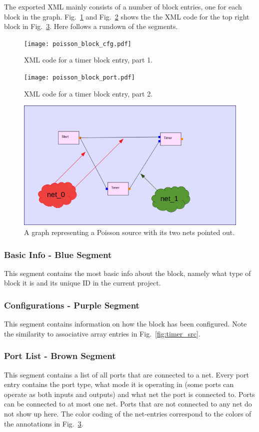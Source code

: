 \documentclass[journal,comsoc]{IEEEtran}
\begin{document}
The exported XML mainly consists of a number of block entries, one for each block in the graph.
Fig.~\ref{fig:xml1} and Fig.~\ref{fig:xml2} shows the the XML code for the top right block in
Fig.~\ref{fig:net}. Here follows a rundown of the segments.
\begin{figure}[!t]
    \centering
    \texttt{[image: poisson\_block\_cfg.pdf]}
    \caption{XML code for a timer block entry, part 1.}
    \label{fig:xml1}
\end{figure}
\begin{figure}[!t]
    \centering
    \texttt{[image: poisson\_block\_port.pdf]}
    \caption{XML code for a timer block entry, part 2.}
    \label{fig:xml2}
\end{figure}
\begin{figure}[!t]
    \centering
    \includegraphics[width=\columnwidth]{poisson_nets.png}
    \caption{A graph representing a Poisson source with its two nets pointed out.}
    \label{fig:net}
\end{figure}

\subsubsection{Basic Info - Blue Segment}
This segment contains the most basic info about the block, namely
what type of block it is and its unique ID in the current project.

\subsubsection{Configurations - Purple Segment}
This segment contains information on how the block has been configured. Note
the similarity to associative array entries in Fig.~\ref{fig:timer_src}.

\subsubsection{Port List - Brown Segment}
This segment contains a list of all ports that are connected to a net. Every port entry contains
the port type, what mode it is operating in (some ports can operate as both inputs and outputs)
and what net the port is connected to. Ports can be connected to at most one net. Ports that
are not connected to any net do not show up here. The color coding of the net-entries correspond
to the colors of the annotations in Fig.~\ref{fig:net}.
\end{document}
